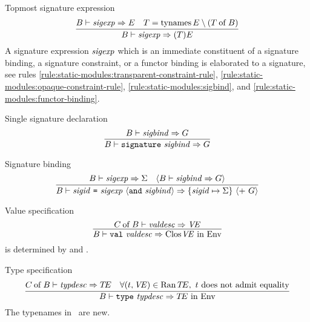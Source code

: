 \begin{inference-rule}{Topmost signature expression}
\begin{equation}\label{rule:static-modules:topmost-sigexp}
\vcenter{\infer{\B\ts\sigexp\ra (\T)\E}
  {\B\ts\sigexp\ra\E
    &\T= \TyNamesFcn\E\setminus(\of{\T}{\B})}}
\end{equation}
A signature expression $\textit{sigexp\/}$ which is an immediate constituent of
a signature binding, a signature constraint, or a
functor binding is elaborated to a signature, see rules
\ref{rule:static-modules:transparent-constraint-rule}, \ref{rule:static-modules:opaque-constraint-rule},
\ref{rule:static-modules:sigbind}, and \ref{rule:static-modules:functor-binding}.
\end{inference-rule}


\begin{inference-rule}{Single signature declaration}
\begin{equation}\label{rule:static-modules:single-sigdec}
\vcenter{\infer{\B\ts\singsigdec\ra\G}
  {\B\ts\sigbind\ra\G}}
\end{equation}
\end{inference-rule}


\begin{inference-rule}{Signature binding}
\begin{equation}\label{rule:static-modules:sigbind}
\vcenter{\infer{\B\ts\sigbinder\ra\{\sigid\mapsto\sig\}
       \ \optional{+\ \G}}
  {\B\ts\sigexp\ra\sig
    & \optional{\B\ts\sigbind\ra\G}}}
\end{equation}
\end{inference-rule}


\begin{inference-rule}{Value specification}
\begin{equation}\label{rule:static-modules:value-specification}
\vcenter{\infer{\B\ts\valspec\ra\cl{}{\VE}\ \In\ \Env}
  {\of{\C}{\B}\ts\valdesc\ra\VE}}
\end{equation}
\VE{} is determined by \B{} and \valdesc.
\end{inference-rule}

\begin{inference-rule}{Type specification}
\begin{equation}\label{rule:static-modules:type-specification}
\vcenter{\infer{\B\ts\typespec\ra\TE\ \In\ \Env}
  {\of{\C}{\B}\ts\typdesc\ra\TE
    & \forall(\t,\VE)\in\Ran\TE,\hbox{\ $t$ does not admit equality}}}
\end{equation}
The typenames in \TE\ are new.
\end{inference-rule}

